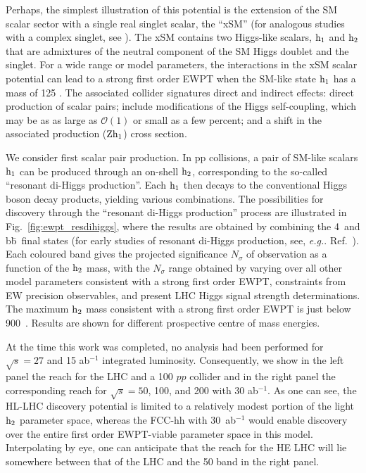 Perhaps, the simplest illustration of this potential is the extension of the SM scalar sector with a single real singlet scalar\cite{Espinosa:1993bs,Choi:1993cv,Ham:2004cf,Profumo:2007wc,Cline:2012hg,Espinosa:2011ax,No:2013wsa,Curtin:2014jma,Kotwal:2016tex,Brauner:2016fla,Huang:2016cjm,Chen:2017qcz,Huang:2017jws}, the ``xSM'' \cite{Barger:2007im} (for analogous studies with a complex singlet, see \cite{Jiang:2015cwa,Chiang:2017nmu}). 
The xSM contains two Higgs-like scalars, $\rm h_{1}$ and $\rm h_{2}$ that are admixtures of the neutral component of the SM Higgs doublet and the singlet. For a wide range or model parameters, the interactions in the xSM scalar potential can  lead to a strong first order EWPT when the SM-like state $\rm h_1$ has a mass of 125 \UGeV. The associated collider signatures direct and indirect effects:  direct production of scalar pairs; include modifications of the Higgs self-coupling, which may be as as large as $\mathcal{O}(1)$ or small as a few percent; and a shift in the associated production ($\rm Zh_1$) cross section. 

We consider first scalar pair production. In pp collisions, a pair of SM-like scalars $\rm h_1$ can be produced through an on-shell $\rm h_2$, corresponding to the so-called ``resonant di-Higgs production''.  Each $\rm h_1$ then decays to the conventional Higgs boson decay products, yielding various combinations. The possibilities for discovery through the ``resonant di-Higgs production'' process are illustrated in Fig.~\ref{fig:ewpt_resdihiggs}, where the results are obtained by combining the 4\texttau\ and b\={b}\textgamma\textgamma\ final states\cite{Kotwal:2016tex} (for early studies of resonant di-Higgs production, see, {\it e.g.}. Ref.~\cite{Baur:2003gp}). Each coloured band gives the projected significance $N_\sigma$ of observation as a function of the $\rm h_2$ mass, with the $N_\sigma$ range obtained by varying over all other model parameters consistent with a strong first order EWPT, constraints from EW precision observables, and present LHC Higgs signal strength determinations.  The maximum $\rm h_2$ mass consistent with a strong first order EWPT is just below 900~\UGeV.  Results are shown for different prospective centre of mass energies.

At the time this work was completed, no analysis had been performed for $\sqrt{s} = 27 $ \UTeV and 15 ab$^{-1}$ integrated luminosity. Consequently, we show in the left panel the reach for the LHC and a 100 \UTeV $pp$ collider and in the right panel the corresponding reach for $\sqrt{s} = 50$, 100, and 200 \UTeV with 30 ab$^{-1}$. As one can see, the HL-LHC discovery potential is limited to a relatively modest portion of the light $\rm h_2$ parameter space, whereas the FCC-hh with 30~ab$^{-1}$ would enable discovery over the entire first order EWPT-viable parameter space in this model. Interpolating by eye, one can anticipate that the reach for the HE LHC will lie somewhere between that of the LHC and the 50 \UTeV band in the right panel. 

